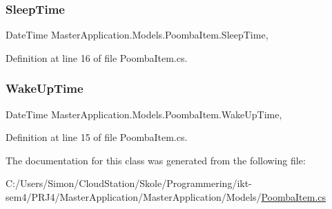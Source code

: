 \mbox{\label{class_master_application_1_1_models_1_1_poomba_item_a007110e370be4b07adb166ec630e63bb}} 
\subsubsection{\texorpdfstring{Sleep\+Time}{SleepTime}}
{\footnotesize\ttfamily Date\+Time Master\+Application.\+Models.\+Poomba\+Item.\+Sleep\+Time\hspace{0.3cm}{\ttfamily [get]}, {\ttfamily [set]}}



Definition at line 16 of file Poomba\+Item.\+cs.

\mbox{\label{class_master_application_1_1_models_1_1_poomba_item_a88b6e2d533473fea1a58689f22591c5e}} 
\subsubsection{\texorpdfstring{Wake\+Up\+Time}{WakeUpTime}}
{\footnotesize\ttfamily Date\+Time Master\+Application.\+Models.\+Poomba\+Item.\+Wake\+Up\+Time\hspace{0.3cm}{\ttfamily [get]}, {\ttfamily [set]}}



Definition at line 15 of file Poomba\+Item.\+cs.



The documentation for this class was generated from the following file\+:\begin{DoxyCompactItemize}
\item 
C\+:/\+Users/\+Simon/\+Cloud\+Station/\+Skole/\+Programmering/ikt-\/sem4/\+P\+R\+J4/\+Master\+Application/\+Master\+Application/\+Models/\mbox{\hyperlink{_master_application_2_master_application_2_models_2_poomba_item_8cs}{Poomba\+Item.\+cs}}\end{DoxyCompactItemize}
